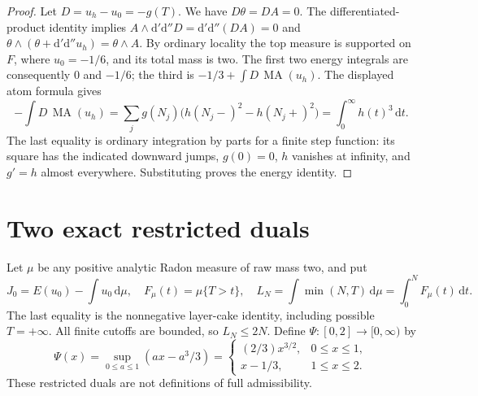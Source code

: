 \documentclass[11pt]{article}
\newcommand{\MA}{\operatorname{MA}}
\newcommand{\DD}{\mathrm d'\mathrm d''}
\begin{document}
\begin{proof}
Let $D=u_h-u_0=-g(T)$. We have $D\theta=DA=0$.
The differentiated-product identity implies
$A\wedge\DD D=\DD(DA)=0$ and
$\theta\wedge(\theta+\DD u_h)=\theta\wedge A$.
By ordinary locality the top measure is supported on $F$, where
$u_0=-1/6$, and its total mass is two. The first two energy integrals
are consequently $0$ and $-1/6$; the third is
$-1/3+\int D\,\MA(u_h)$. The displayed atom formula gives
\[
 -\int D\,\MA(u_h)=\sum_j g(N_j)
                \bigl(h(N_j-)^2-h(N_j+)^2\bigr)
                         =\int_0^\infty h(t)^3\,\mathrm dt.
\]
The last equality is ordinary integration by parts for a finite step
function: its square has the indicated downward jumps, $g(0)=0$,
$h$ vanishes at infinity, and $g'=h$ almost everywhere.
Substituting proves the energy identity.
\end{proof}

\section{Two exact restricted duals}
Let $\mu$ be any positive analytic Radon measure of raw mass two, and put
\[
 J_0=E(u_0)-\int u_0\,\mathrm d\mu,\quad
 F_\mu(t)=\mu\{T>t\},\quad
 L_N=\int\min(N,T)\,\mathrm d\mu=\int_0^N F_\mu(t)\,\mathrm dt.
\]
The last equality is the nonnegative layer-cake identity, including
possible $T=+\infty$. All finite cutoffs are bounded, so $L_N\leq2N$.
Define $\Psi:[0,2]\to[0,\infty)$ by
\[
 \Psi(x)=\sup_{0\leq a\leq1}(ax-a^3/3)
 =\begin{cases}(2/3)x^{3/2},&0\leq x\leq1,\\
                x-1/3,&1\leq x\leq2.
   \end{cases}
\]
These restricted duals are not definitions of full admissibility.
\end{document}

